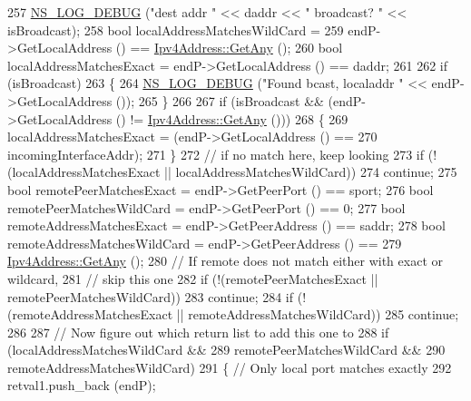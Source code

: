 \begin{DoxyCode}
257       \hyperlink{group__logging_ga413f1886406d49f59a6a0a89b77b4d0a}{NS\_LOG\_DEBUG} (\textcolor{stringliteral}{"dest addr "} << daddr << \textcolor{stringliteral}{" broadcast? "} << isBroadcast);
258       \textcolor{keywordtype}{bool} localAddressMatchesWildCard = 
259         endP->GetLocalAddress () == \hyperlink{classns3_1_1Ipv4Address_a7a39b330c8e701183a411d5779fca1a4}{Ipv4Address::GetAny} ();
260       \textcolor{keywordtype}{bool} localAddressMatchesExact = endP->GetLocalAddress () == daddr;
261 
262       \textcolor{keywordflow}{if} (isBroadcast)
263         \{
264           \hyperlink{group__logging_ga413f1886406d49f59a6a0a89b77b4d0a}{NS\_LOG\_DEBUG} (\textcolor{stringliteral}{"Found bcast, localaddr "} << endP->GetLocalAddress ());
265         \}
266 
267       \textcolor{keywordflow}{if} (isBroadcast && (endP->GetLocalAddress () != \hyperlink{classns3_1_1Ipv4Address_a7a39b330c8e701183a411d5779fca1a4}{Ipv4Address::GetAny} ()))
268         \{
269           localAddressMatchesExact = (endP->GetLocalAddress () ==
270                                       incomingInterfaceAddr);
271         \}
272       \textcolor{comment}{// if no match here, keep looking}
273       \textcolor{keywordflow}{if} (!(localAddressMatchesExact || localAddressMatchesWildCard))
274         \textcolor{keywordflow}{continue}; 
275       \textcolor{keywordtype}{bool} remotePeerMatchesExact = endP->GetPeerPort () == sport;
276       \textcolor{keywordtype}{bool} remotePeerMatchesWildCard = endP->GetPeerPort () == 0;
277       \textcolor{keywordtype}{bool} remoteAddressMatchesExact = endP->GetPeerAddress () == saddr;
278       \textcolor{keywordtype}{bool} remoteAddressMatchesWildCard = endP->GetPeerAddress () ==
279         \hyperlink{classns3_1_1Ipv4Address_a7a39b330c8e701183a411d5779fca1a4}{Ipv4Address::GetAny} ();
280       \textcolor{comment}{// If remote does not match either with exact or wildcard,}
281       \textcolor{comment}{// skip this one}
282       \textcolor{keywordflow}{if} (!(remotePeerMatchesExact || remotePeerMatchesWildCard))
283         \textcolor{keywordflow}{continue};
284       \textcolor{keywordflow}{if} (!(remoteAddressMatchesExact || remoteAddressMatchesWildCard))
285         \textcolor{keywordflow}{continue};
286 
287       \textcolor{comment}{// Now figure out which return list to add this one to}
288       \textcolor{keywordflow}{if} (localAddressMatchesWildCard &&
289           remotePeerMatchesWildCard &&
290           remoteAddressMatchesWildCard)
291         \{ \textcolor{comment}{// Only local port matches exactly}
292           retval1.push\_back (endP);

\end{DoxyCode}
